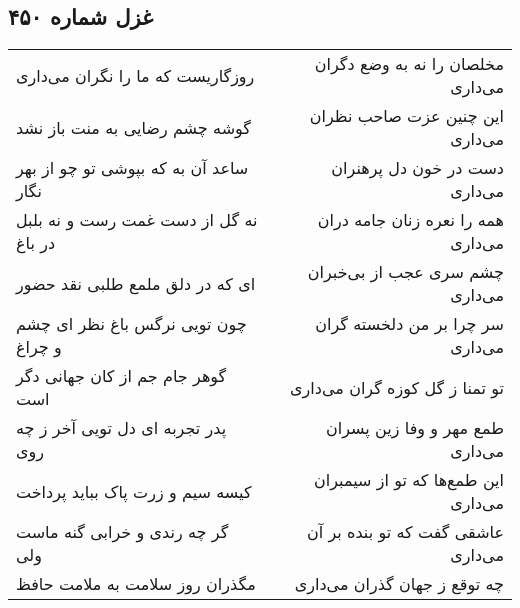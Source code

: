 \begin{center}
\section*{غزل شماره ۴۵۰}
\label{sec:sh450}
\begin{longtable}{l p{0.5cm} r}
روزگاریست که ما را نگران می‌داری
&&
مخلصان را نه به وضع دگران می‌داری
\\
گوشه چشم رضایی به منت باز نشد
&&
این چنین عزت صاحب نظران می‌داری
\\
ساعد آن به که بپوشی تو چو از بهر نگار
&&
دست در خون دل پرهنران می‌داری
\\
نه گل از دست غمت رست و نه بلبل در باغ
&&
همه را نعره زنان جامه دران می‌داری
\\
ای که در دلق ملمع طلبی نقد حضور
&&
چشم سری عجب از بی‌خبران می‌داری
\\
چون تویی نرگس باغ نظر ای چشم و چراغ
&&
سر چرا بر من دلخسته گران می‌داری
\\
گوهر جام جم از کان جهانی دگر است
&&
تو تمنا ز گل کوزه گران می‌داری
\\
پدر تجربه ای دل تویی آخر ز چه روی
&&
طمع مهر و وفا زین پسران می‌داری
\\
کیسه سیم و زرت پاک بباید پرداخت
&&
این طمع‌ها که تو از سیمبران می‌داری
\\
گر چه رندی و خرابی گنه ماست ولی
&&
عاشقی گفت که تو بنده بر آن می‌داری
\\
مگذران روز سلامت به ملامت حافظ
&&
چه توقع ز جهان گذران می‌داری
\\
\end{longtable}
\end{center}
